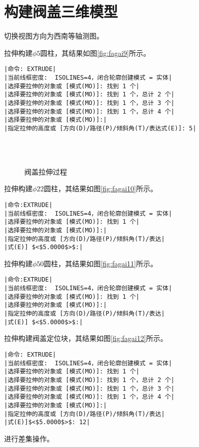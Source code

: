 \section{构建阀盖三维模型}
\begin{procedure}
\item 切换视图方向为西南等轴测图。
\item 拉伸构建$\phi 5$圆柱，其结果如图\ref{fig:fagai9}所示。
\begin{lstlisting}
|命令: EXTRUDE|
|当前线框密度:  ISOLINES=4，闭合轮廓创建模式 = 实体|
|选择要拉伸的对象或 [模式(MO)]: 找到 1 个|
|选择要拉伸的对象或 [模式(MO)]: 找到 1 个，总计 2 个|
|选择要拉伸的对象或 [模式(MO)]: 找到 1 个，总计 3 个|
|选择要拉伸的对象或 [模式(MO)]: 找到 1 个，总计 4 个|
|选择要拉伸的对象或 [模式(MO)]:|
|指定拉伸的高度或 [方向(D)/路径(P)/倾斜角(T)/表达式(E)]: 5|
\end{lstlisting}
\begin{figure}[htbp]
\centering
{}\hspace{30pt}
\\
\hspace{30pt}
\\
\caption{阀盖拉伸过程}
\end{figure}
\item 拉伸构建$\phi 22$圆柱，其结果如图\ref{fig:fagai10}所示。
\begin{lstlisting}
|命令:EXTRUDE|
|当前线框密度:  ISOLINES=4，闭合轮廓创建模式 = 实体|
|选择要拉伸的对象或 [模式(MO)]: 找到 1 个|
|选择要拉伸的对象或 [模式(MO)]:|
|指定拉伸的高度或 [方向(D)/路径(P)/倾斜角(T)/表达|
|式(E)] $<$5.0000$>$:|
\end{lstlisting}
\item 拉伸构建$\phi 50$圆柱，其结果如图\ref{fig:fagai11}所示。
\begin{lstlisting}
|命令:EXTRUDE|
|当前线框密度:  ISOLINES=4，闭合轮廓创建模式 = 实体|
|选择要拉伸的对象或 [模式(MO)]: 找到 1 个|
|选择要拉伸的对象或 [模式(MO)]:|
|指定拉伸的高度或 [方向(D)/路径(P)/倾斜角(T)/表达|
|式(E)] $<$5.0000$>$:|
\end{lstlisting}
\item 拉伸构建阀盖定位块，其结果如图\ref{fig:fagai12}所示。
\begin{lstlisting}
|命令: EXTRUDE|
|当前线框密度:  ISOLINES=4，闭合轮廓创建模式 = 实体|
|选择要拉伸的对象或 [模式(MO)]: 找到 1 个|
|选择要拉伸的对象或 [模式(MO)]: 找到 1 个，总计 2 个|
|选择要拉伸的对象或 [模式(MO)]: 找到 1 个，总计 3 个|
|选择要拉伸的对象或 [模式(MO)]: 找到 1 个，总计 4 个|
|选择要拉伸的对象或 [模式(MO)]:|
|指定拉伸的高度或 [方向(D)/路径(P)/倾斜角(T)/表达|
|式(E)]$<$5.0000$>$: 12|
\end{lstlisting}
\item 进行差集操作。


\end{procedure}
